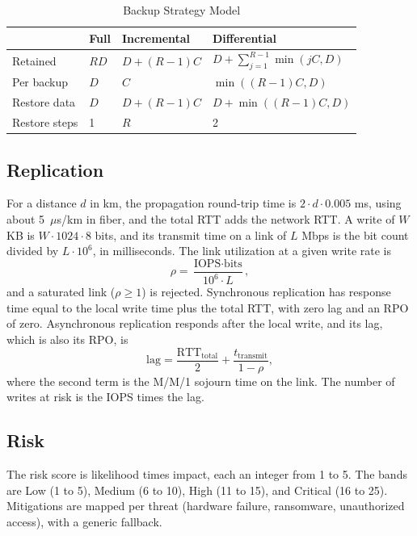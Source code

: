 \documentclass{ieeeaccess}
\begin{document}
\begin{table}[!t]
\caption{Backup Strategy Model}
\label{tab:backupmodel}
\centering
\footnotesize
\setlength{\tabcolsep}{3pt}
\begin{tabular}{llll}
\toprule
 & Full & Incremental & Differential \\
\midrule
Retained & $R D$ & $D + (R-1) C$ & $D + \sum_{j=1}^{R-1} \min(jC, D)$ \\
Per backup & $D$ & $C$ & $\min((R-1)C, D)$ \\
Restore data & $D$ & $D + (R-1) C$ & $D + \min((R-1)C, D)$ \\
Restore steps & 1 & $R$ & 2 \\
\bottomrule
\end{tabular}
\end{table}

\subsection{Replication}
For a distance $d$ in km, the propagation round-trip time is $2 \cdot d \cdot 0.005$ ms, using about 5~$\mu$s/km in fiber, and the total RTT adds the network RTT. A write of $W$ KB is $W \cdot 1024 \cdot 8$ bits, and its transmit time on a link of $L$ Mbps is the bit count divided by $L \cdot 10^6$, in milliseconds. The link utilization at a given write rate is \begin{equation} \rho = \frac{\text{IOPS} \cdot \text{bits}}{10^6 \cdot L}, \end{equation} and a saturated link ($\rho \ge 1$) is rejected. Synchronous replication has response time equal to the local write time plus the total RTT, with zero lag and an RPO of zero. Asynchronous replication responds after the local write, and its lag, which is also its RPO, is \begin{equation} \text{lag} = \frac{\text{RTT}_{\text{total}}}{2} + \frac{t_{\text{transmit}}}{1-\rho}, \label{eq:lag} \end{equation} where the second term is the M/M/1 sojourn time on the link. The number of writes at risk is the IOPS times the lag.

\subsection{Risk}
The risk score is likelihood times impact, each an integer from 1 to 5. The bands are Low (1 to 5), Medium (6 to 10), High (11 to 15), and Critical (16 to 25). Mitigations are mapped per threat (hardware failure, ransomware, unauthorized access), with a generic fallback.
\end{document}
